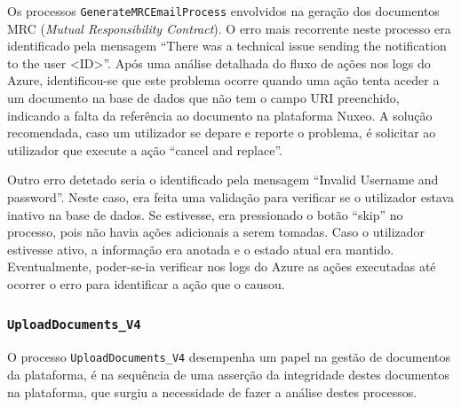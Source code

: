             Os processos \texttt{GenerateMRCEmailProcess} envolvidos na geração dos documentos MRC (\textit{Mutual Responsibility Contract}). O erro mais recorrente neste processo era identificado pela mensagem ``There was a technical issue sending the notification to the user <ID>''. Após uma análise detalhada do fluxo de ações nos logs do Azure, identificou-se que este problema ocorre quando uma ação tenta aceder a um documento na base de dados que não tem o campo URI preenchido, indicando a falta da referência ao documento na plataforma Nuxeo. A solução recomendada, caso um utilizador se depare e reporte o problema, é solicitar ao utilizador que execute a ação ``cancel and replace''.

            Outro erro detetado seria o identificado pela mensagem ``Invalid Username and password''. Neste caso, era feita uma validação para verificar se o utilizador estava inativo na base de dados. Se estivesse, era pressionado o botão ``skip'' no processo, pois não havia ações adicionais a serem tomadas. Caso o utilizador estivesse ativo, a informação era anotada e o estado atual era mantido. Eventualmente, poder-se-ia verificar nos logs do Azure as ações executadas até ocorrer o erro para identificar a ação que o causou.


        
        \subsubsection{\texttt{UploadDocuments\_V4}}\label{secsec:uploaddocuments_v4}

            O processo \texttt{UploadDocuments\_V4} desempenha um papel na gestão de documentos da plataforma, é na sequência de uma asserção da integridade destes documentos na plataforma, que surgiu a necessidade de fazer a análise destes processos. 
            
